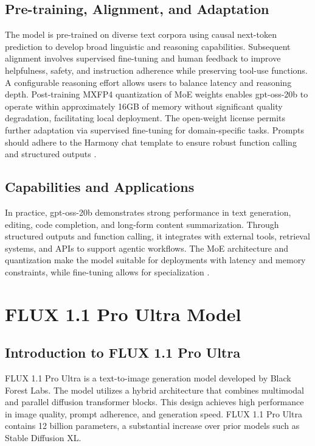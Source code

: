 \subsection{Pre-training, Alignment, and Adaptation}

The model is pre-trained on diverse text corpora using causal next-token prediction to develop broad linguistic and reasoning capabilities. Subsequent alignment involves supervised fine-tuning and human feedback to improve helpfulness, safety, and instruction adherence while preserving tool-use functions. A configurable reasoning effort allows users to balance latency and reasoning depth. Post-training MXFP4 quantization of MoE weights enables gpt-oss-20b to operate within approximately 16GB of memory without significant quality degradation, facilitating local deployment. The open-weight license permits further adaptation via supervised fine-tuning for domain-specific tasks. Prompts should adhere to the Harmony chat template to ensure robust function calling and structured outputs \cite{openai2025gptoss}.

\subsection{Capabilities and Applications}

In practice, gpt-oss-20b demonstrates strong performance in text generation, editing, code completion, and long-form content summarization. Through structured outputs and function calling, it integrates with external tools, retrieval systems, and APIs to support agentic workflows. The MoE architecture and quantization make the model suitable for deployments with latency and memory constraints, while fine-tuning allows for specialization \cite{openai2025gptoss}.

\section{FLUX 1.1 Pro Ultra Model}

\subsection{Introduction to FLUX 1.1 Pro Ultra}
FLUX 1.1 Pro Ultra is a text-to-image generation model developed by Black Forest Labs. The model utilizes a hybrid architecture that combines multimodal and parallel diffusion transformer blocks. This design achieves high performance in image quality, prompt adherence, and generation speed. FLUX 1.1 Pro Ultra contains 12 billion parameters, a substantial increase over prior models such as Stable Diffusion XL.


